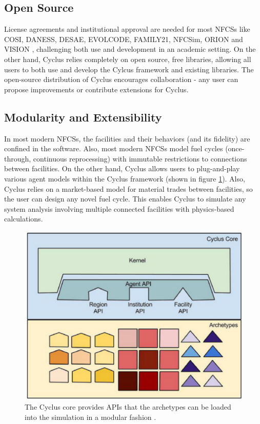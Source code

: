 \subsection{Open Source}
License agreements and institutional
approval are needed for most \glspl{NFCS} like COSI, DANESS, DESAE, EVOLCODE,
FAMILY21, NFCSim, ORION and VISION \cite{jacobson_verifiable_2010}, challenging
 both use and development in an academic setting.
On the other hand, Cyclus relies completely on open source,
free libraries, allowing all users to both use and develop the
Cylcus framework and existing libraries. The open-source distribution
of Cyclus encourages collaboration - any user can propose
improvements or contribute extensions for Cyclus.

\subsection{Modularity and Extensibility}
In most modern \glspl{NFCS}, the facilities and their
behaviors (and its fidelity) are confined in the software.
Also, most modern \glspl{NFCS} model
fuel cycles (once-through, continuous reprocessing)
with immutable restrictions to connections between facilities. On the
other hand, Cyclus allows users to plug-and-play various agent models
within the Cyclus framework (shown in figure \ref{fig:core}).
Also, Cyclus relies on a market-based model
for material trades between facilities, so the user can design
any novel fuel cycle. This enables Cyclus to simulate any system analysis
involving multiple connected facilities with physics-based
calculations.


\begin{figure}[htbp!]
	\begin{center}
		\includegraphics[scale=0.2]{./images/cyclus_core.png}
	\end{center}
	\caption{The Cyclus core provides APIs that the archetypes
			can be loaded into the simulation in a modular fashion
			\cite{huff_fundamental_2016}.}
	\label{fig:core}
\end{figure}

